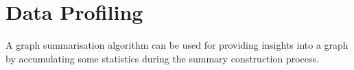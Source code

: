 




\section{Data Profiling}
\label{chap03:review:query-profiling}

A graph summarisation algorithm can be used for providing insights into a graph by accumulating some statistics during the summary construction process.\\

